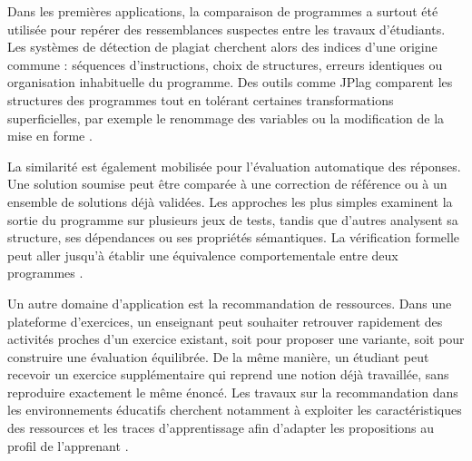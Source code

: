 \documentclass[12pt,a4paper,oneside]{report}
\begin{document}
\vspace{20pt}


Dans les premières applications, la comparaison de programmes a surtout été
utilisée pour repérer des ressemblances suspectes entre les travaux
d'étudiants. Les systèmes de détection de plagiat cherchent alors des
indices d'une origine commune : séquences d'instructions, choix de
structures, erreurs identiques ou organisation inhabituelle du programme.
Des outils comme JPlag comparent les structures des programmes tout en
tolérant certaines transformations superficielles, par exemple le renommage
des variables ou la modification de la mise en forme
\cite{prechelt_finding_nodate}.

\vspace{12pt}


La similarité est également mobilisée pour l'évaluation automatique des
réponses. Une solution soumise peut être comparée à une correction de
référence ou à un ensemble de solutions déjà validées. Les approches les
plus simples examinent la sortie du programme sur plusieurs jeux de tests,
tandis que d'autres analysent sa structure, ses dépendances ou ses
propriétés sémantiques. La vérification formelle peut aller jusqu'à établir
une équivalence comportementale entre deux programmes
\cite{vafeiadis_formal_2025}.

\vspace{12pt}

Un autre domaine d'application est la recommandation de ressources. Dans une
plateforme d'exercices, un enseignant peut souhaiter retrouver rapidement
des activités proches d'un exercice existant, soit pour proposer une
variante, soit pour construire une évaluation équilibrée. De la même
manière, un étudiant peut recevoir un exercice supplémentaire qui reprend
une notion déjà travaillée, sans reproduire exactement le même énoncé. Les
travaux sur la recommandation dans les environnements éducatifs cherchent
notamment à exploiter les caractéristiques des ressources et les traces
d'apprentissage afin d'adapter les propositions au profil de l'apprenant
\cite{liu_2018,tian_2022}.
\vspace{12pt}
\end{document}

